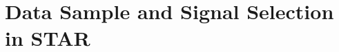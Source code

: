 \chapter{Data Sample and Signal Selection in STAR}\label{chapter:star_data_signal}










\FloatBarrier
